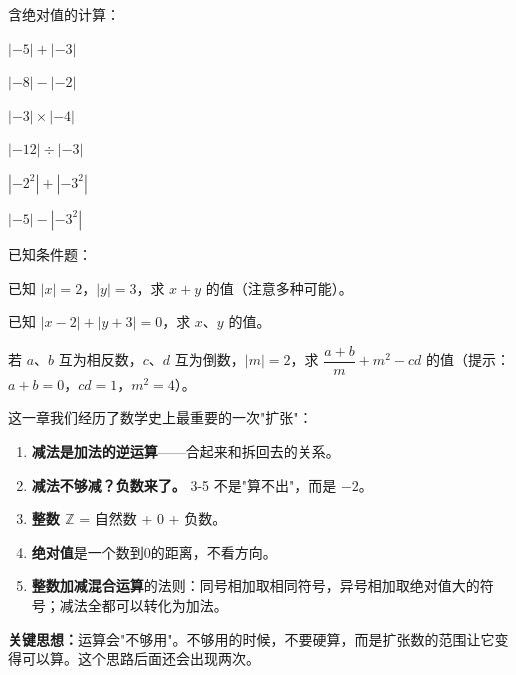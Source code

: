 \begin{exercise}
\item 含绝对值的计算：
  \begin{subexercise}
    \item $|{-5}|+|{-3}|$
    \item $|{-8}|-|{-2}|$
    \item $|{-3}|\times|{-4}|$
    \item $|{-12}|\div|{-3}|$
    \item $|-2^2|+|-3^2|$
    \item $|-5|-|{-3}^2|$
  \end{subexercise}

\item 已知条件题：
  \begin{subexercise}
    \item 已知 $|x|=2$，$|y|=3$，求 $x+y$ 的值（注意多种可能）。
    \item 已知 $|x-2|+|y+3|=0$，求 $x$、$y$ 的值。
  \end{subexercise}

\item 若 $a$、$b$ 互为相反数，$c$、$d$ 互为倒数，$|m|=2$，求 $\dfrac{a+b}{m}+m^2-cd$ 的值（提示：$a+b=0$，$cd=1$，$m^2=4$）。
\end{exercise}


这一章我们经历了数学史上最重要的一次"扩张"：

\begin{enumerate}
  \item \textbf{减法是加法的逆运算}——合起来和拆回去的关系。
  \item \textbf{减法不够减？负数来了。} 3-5 不是"算不出"，而是 $-2$。
  \item \textbf{整数 $\mathbb{Z}$} = 自然数 + 0 + 负数。
  \item \textbf{绝对值}是一个数到0的距离，不看方向。
  \item \textbf{整数加减混合运算}的法则：同号相加取相同符号，异号相加取绝对值大的符号；减法全都可以转化为加法。
\end{enumerate}

\textbf{关键思想：}运算会"不够用"。不够用的时候，不要硬算，而是扩张数的范围让它变得可以算。这个思路后面还会出现两次。

\bigskip

\begin{center}
\end{center}
